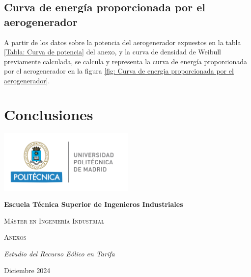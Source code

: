 \documentclass{IEEEtran}
\def\Fecha{Diciembre 2024}
\begin{document}
\subsection{Curva de energía proporcionada por el aerogenerador}

A partir de los datos sobre la potencia del aerogenerador expuestos en la tabla \ref{Tabla: Curva de potencia} del anexo, y la curva de densidad de Weibull previamente calculada, se calcula y representa la curva de energía proporcionada por el aerogenerador en la figura \ref{fig: Curva de energia proporcionada por el aerogenerador}.

\section{Conclusiones}

\printbibliography %

\newpage
\onecolumn

\thispagestyle{empty}
\begin{center}
    {\includegraphics[width=0.5\textwidth]{Imagenes/Logo UPM.png}\par}
    \vspace{1cm}
    {\bfseries\LARGE Escuela Técnica Superior de Ingenieros Industriales \par}
    \vspace{0.5cm}
    {\scshape\Large Máster en Ingeniería Industrial \par}
    \vspace{3cm}
    {\scshape\Huge Anexos \par}
    \vspace{1.5cm}
    {\itshape\Large Estudio del Recurso Eólico en Tarifa \par}
    \vfill
    {\Large \Fecha \par}
\end{center}
\end{document}
